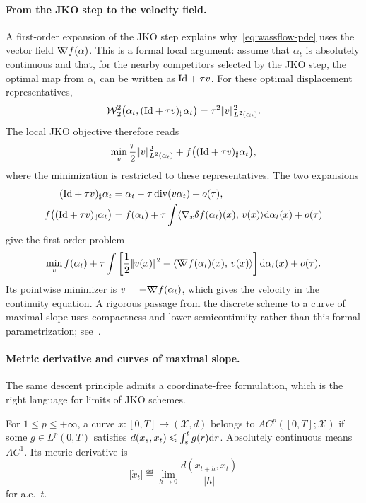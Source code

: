 \paragraph{From the JKO step to the velocity field.}

A first-order expansion of the JKO step explains why~\eqref{eq:wassflow-pde} uses the vector field $\mathord{\nabla\mkern-9.3mu\nabla} f(\alpha)$. This is a formal local argument: assume that $\alpha_t$ is absolutely continuous and that, for the nearby competitors selected by the JKO step, the optimal map from $\alpha_t$ can be written as $\mathrm{Id}+\tau v$. For these optimal displacement representatives,
	\[
		\operatorname{\mathcal{W}}_2^2\bigl(\alpha_t,(\mathrm{Id}+\tau v)_\sharp\alpha_t\bigr)
		=
		\tau^2|\!| v |\!|_{L^2(\alpha_t)}^2.
	\]
The local JKO objective therefore reads
	\[
		\min_v \frac{\tau}{2}|\!| v |\!|_{L^2(\alpha_t)}^2
		+f\bigl((\mathrm{Id}+\tau v)_\sharp\alpha_t\bigr),
	\]
where the minimization is restricted to these representatives. The two expansions
	\begin{align*}
		(\mathrm{Id}+\tau v)_\sharp\alpha_t
		&=
		\alpha_t-\tau\operatorname{div}(v\alpha_t)+o(\tau),\\
		f\bigl((\mathrm{Id}+\tau v)_\sharp\alpha_t\bigr)
		&=
		f(\alpha_t)
		+\tau\int\langle \nabla_x\delta f(\alpha_t)(x),\,v(x)\rangle\mathrm{d}\alpha_t(x)
		+o(\tau)
	\end{align*}
give the first-order problem
	\[
		\min_v f(\alpha_t)
		+\tau\int\left[
			\frac12|\!| v(x) |\!|^2
			+\langle \mathord{\nabla\mkern-9.3mu\nabla} f(\alpha_t)(x),\,v(x)\rangle
		\right]\mathrm{d}\alpha_t(x)
		+o(\tau).
	\]
Its pointwise minimizer is $v=-\mathord{\nabla\mkern-9.3mu\nabla} f(\alpha_t)$, which gives the velocity in the continuity equation. A rigorous passage from the discrete scheme to a curve of maximal slope uses compactness and lower-semicontinuity rather than this formal parametrization; see~\citet{JDB-JKO,ambrosio2006gradient}.

\paragraph{Metric derivative and curves of maximal slope.}

The same descent principle admits a coordinate-free formulation, which is the right language for limits of JKO schemes.
\begin{defn}\label{def-metric-derivative-ac-curve}
For \(1\leq p\leq+\infty\), a curve $x:[0,T]\to(\mathcal X,d)$ belongs to \(AC^p([0,T];\mathcal X)\) if some $g\in L^p(0,T)$ satisfies $d(x_s,x_t)\leqslant\int_s^t g(r)\mathrm{d} r$. Absolutely continuous means \(AC^1\). Its metric derivative is
		\[
		|\dot x_t|
		\eqdef
			\lim_{h\to 0}\frac{d(x_{t+h},x_t)}{|h|}
		\]
for a.e.\ $t$.
\end{defn}

